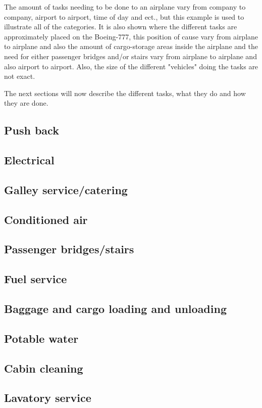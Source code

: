 The amount of tasks needing to be done to an airplane vary from company to company, airport to airport, time of day and ect., but this example is used to illustrate all of the categories. It is also shown where the different tasks are approximately placed on the Boeing-777, this position of cause vary from airplane to airplane and also the amount of cargo-storage areas inside the airplane and the need for either passenger bridges and/or stairs vary from airplane to airplane and also airport to airport. Also, the size of the different "vehicles" doing the tasks are not exact.

The next sections will now describe the different tasks, what they do and how they are done.

\subsection{Push back}
\subsection{Electrical}
\subsection{Galley service/catering}
\subsection{Conditioned air}
\subsection{Passenger bridges/stairs}
\subsection{Fuel service}

\subsection{Baggage and cargo loading and unloading}
\subsection{Potable water}
\subsection{Cabin cleaning}
\subsection{Lavatory service}
